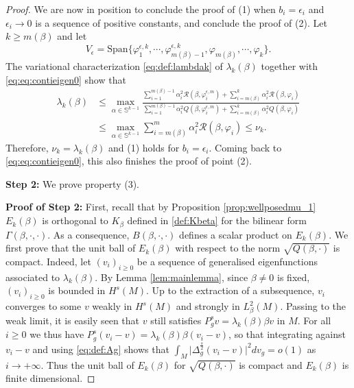 \documentclass[10pt]{amsart}
\numberwithin{equation}{section}
\def\ep{{\varepsilon}}
\newcommand{\vp}{\varphi}
\def \ep{\epsilon}
\theoremstyle{plain}
\theoremstyle{remark}
\begin{document}
\begin{proof}
We are now in position to conclude the proof of (1) when $b_i = \epsilon_i$ and  $\epsilon_i \to 0$ is a sequence of positive constants, and conclude the proof of (2).  Let $k \ge m(\beta)$ and let
$$V_{\epsilon}  = \text{Span} \Big \{ \vp_1^{\epsilon,k},\cdots,\vp_{m(\beta)-1}^{\epsilon,k},\vp_{m(\beta)},\cdots, \vp_{k} \Big \}. $$
The variational characterization \eqref{eq:def:lambdak} of $\lambda_k(\beta)$ together with \eqref{eq:eq:contieigen0} show that 
\begin{equation} \label{eq:contieigen2} \begin{aligned}
\lambda_k(\beta) & \leq \max_{\alpha \in \mathbb{S}^{k-1}} \frac{\sum_{i=1}^{m(\beta)-1}\alpha_i^2 \mathcal{R}(\beta,  \vp_i^{\epsilon,m})+  \sum_{i=m(\beta)}^k \alpha_i^2 \mathcal{R}(\beta,  \vp_i)}{\sum_{i=1}^{m(\beta)-1}\alpha_i^2 Q(\beta,  \vp_i^{\epsilon,m})+  \sum_{i=m(\beta)}^k \alpha_i^2 Q(\beta,  \vp_i)} \\
& \le  \max_{\alpha \in \mathbb{S}^{k-1}}  \sum_{i=m(\beta)}^m \alpha_i^2 \mathcal{R}(\beta,  \vp_i) \leq \nu_k.
\end{aligned} 
\end{equation}
Therefore, $\nu_k = \lambda_k(\beta)$ and (1) holds for $b_i = \ep_i$. Coming back to \eqref{eq:eq:contieigen0}, this also finishes the proof of point (2). 


\medskip

\textbf{Step 2:} We prove property (3).

\medskip


\textbf{Proof of Step 2:} First, recall that by Proposition \ref{prop:wellposedmu_1} $E_k(\beta)$ is orthogonal to $K_{\beta}$ defined in \eqref{def:Kbeta} for the bilinear form $\Gamma(\beta, \cdot, \cdot)$. As a consequence, $B(\beta, \cdot, \cdot)$ defines a scalar product on $E_k(\beta)$. We first prove that the unit ball of $E_k(\beta)$ with respect to the norm $\sqrt{Q(\beta,\cdot)}$ is compact. Indeed, let $(v_i)_{i \ge0}$ be a sequence of generalised eigenfunctions associated to $\lambda_k(\beta)$. By Lemma \ref{lem:mainlemma}, since $\beta \neq 0$ is fixed, $(v_i)_{i \ge0}$ is bounded in $H^s(M)$. Up to the extraction of a subsequence, $v_i$ converges to some $v$ weakly in $H^s(M)$ and strongly in $L^2_{\beta}(M)$. Passing to the weak limit, it is easily seen that $v$ still satisfies $P_g^s v = \lambda_k(\beta) \beta v$ in $M$. For all $i \ge 0$ we thus have $P_g^s(v_i - v) = \lambda_k(\beta) \beta (v_i-v)$, so that integrating against $v_i-v$ and using \eqref{eq:def:Ag} shows that $ \int_M \big|\Delta_g^{\frac{s}{2}} (v_i-v) \big|^2 dv_g = o(1)$  as $i \to + \infty$. Thus the unit ball of  $E_k(\beta)$ for $\sqrt{Q(\beta,\cdot)}$ is compact and $E_k(\beta)$ is finite dimensional. 


\end{proof}
\end{document}
